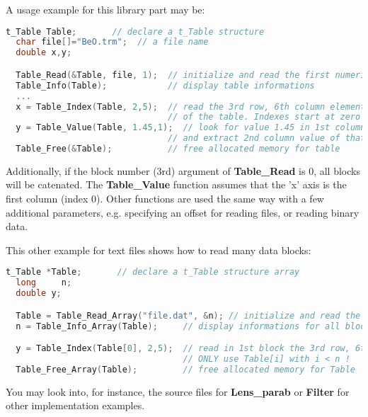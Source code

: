 A usage example for this library part may be:
\begin{lstlisting}[language=C]
  t_Table Table;       // declare a t_Table structure
  char file[]="BeO.trm";  // a file name
  double x,y;

  Table_Read(&Table, file, 1);  // initialize and read the first numerical block
  Table_Info(Table);            // display table informations
  ...
  x = Table_Index(Table, 2,5);  // read the 3rd row, 6th column element
                                // of the table. Indexes start at zero in C.
  y = Table_Value(Table, 1.45,1);  // look for value 1.45 in 1st column (x axis)
                                // and extract 2nd column value of that row
  Table_Free(&Table);           // free allocated memory for table
\end{lstlisting}
Additionally, if the block number (3rd) argument of  {\bfseries Table\_Read} is 0, all blocks will be catenated.
The {\bfseries Table\_Value} function assumes that the 'x' axis is the first column (index 0).
Other functions are used the same way with a few additional parameters, e.g. specifying an offset for reading files, or reading binary data.

This other example for text files shows how to read many data blocks:
\begin{lstlisting}[language=C]
  t_Table *Table;       // declare a t_Table structure array
  long     n;
  double y;

  Table = Table_Read_Array("file.dat", &n); // initialize and read the all numerical block
  n = Table_Info_Array(Table);     // display informations for all blocks (also returns n)

  y = Table_Index(Table[0], 2,5);  // read in 1st block the 3rd row, 6th column element
                                   // ONLY use Table[i] with i < n !
  Table_Free_Array(Table);         // free allocated memory for Table
\end{lstlisting}

You may look into, for instance, the source files for
\textbf{Lens\_parab} or \textbf{Filter}
for other implementation examples.


